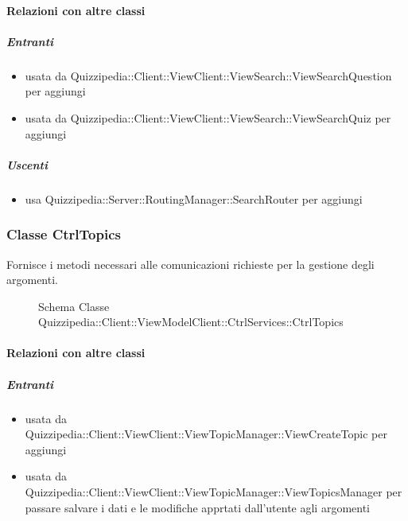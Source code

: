 \paragraph{Relazioni con altre classi}
\subparagraph{Entranti}
\begin{itemize}
\item usata da Quizzipedia::Client::ViewClient::ViewSearch::ViewSearchQuestion per aggiungi
\item usata da Quizzipedia::Client::ViewClient::ViewSearch::ViewSearchQuiz per aggiungi
\end{itemize}
\subparagraph{Uscenti}
\begin{itemize}
\item usa Quizzipedia::Server::RoutingManager::SearchRouter per aggiungi
\end{itemize}
\subsubsection{Classe CtrlTopics}
Fornisce i metodi necessari alle comunicazioni richieste per la gestione degli argomenti.
\begin{figure}[H]
\centering
\noindent{}
\caption[Schema Classe CtrlTopics]{Schema Classe Quizzipedia::Client::ViewModelClient::CtrlServices::CtrlTopics}
\end{figure}
\paragraph{Relazioni con altre classi}
\subparagraph{Entranti}
\begin{itemize}
\item usata da Quizzipedia::Client::ViewClient::ViewTopicManager::ViewCreateTopic per aggiungi
\item usata da Quizzipedia::Client::ViewClient::ViewTopicManager::ViewTopicsManager per passare salvare i dati e le modifiche apprtati dall'utente agli argomenti
\end{itemize}
